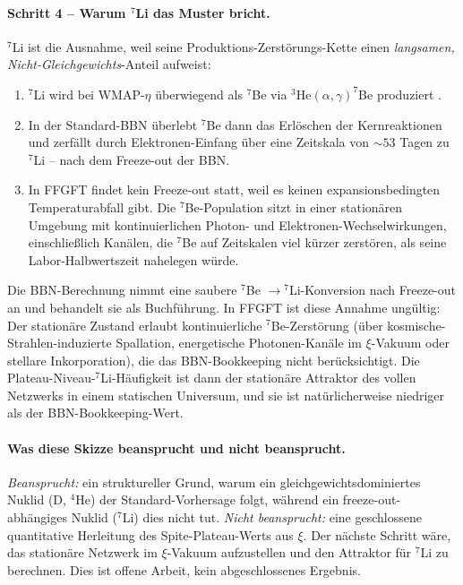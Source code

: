 \documentclass[11pt,a4paper]{article}
\begin{document}
\paragraph{Schritt 4 -- Warum $^7$Li das Muster bricht.}
$^7$Li ist die Ausnahme, weil seine Produktions-Zerstörungs-Kette einen \emph{langsamen, Nicht-Gleichgewichts}-Anteil aufweist:
\begin{enumerate}\itemsep1pt
\item $^7$Li wird bei WMAP-$\eta$ überwiegend als $^7$Be via $^3$He$(\alpha,\gamma)^7$Be produziert \cite{fields2011}.
\item In der Standard-BBN überlebt $^7$Be dann das Erlöschen der Kernreaktionen und zerfällt durch Elektronen-Einfang über eine Zeitskala von $\sim 53$ Tagen zu $^7$Li -- nach dem Freeze-out der BBN.
\item In FFGFT findet kein Freeze-out statt, weil es keinen expansionsbedingten Temperaturabfall gibt. Die $^7$Be-Population sitzt in einer stationären Umgebung mit kontinuierlichen Photon- und Elektronen-Wechselwirkungen, einschließlich Kanälen, die $^7$Be auf Zeitskalen viel kürzer zerstören, als seine Labor-Halbwertszeit nahelegen würde.
\end{enumerate}
Die BBN-Berechnung nimmt eine saubere $^7$Be $\to {}^7$Li-Konversion nach Freeze-out an und behandelt sie als Buchführung. In FFGFT ist diese Annahme ungültig: Der stationäre Zustand erlaubt kontinuierliche $^7$Be-Zerstörung (über kosmische-Strahlen-induzierte Spallation, energetische Photonen-Kanäle im $\xi$-Vakuum oder stellare Inkorporation), die das BBN-Bookkeeping nicht berücksichtigt. Die Plateau-Niveau-$^7$Li-Häufigkeit ist dann der stationäre Attraktor des vollen Netzwerks in einem statischen Universum, und sie ist natürlicherweise niedriger als der BBN-Bookkeeping-Wert.

\paragraph{Was diese Skizze beansprucht und nicht beansprucht.}
\textit{Beansprucht:} ein struktureller Grund, warum ein gleichgewichtsdominiertes Nuklid (D, $^4$He) der Standard-Vorhersage folgt, während ein freeze-out-abhängiges Nuklid ($^7$Li) dies nicht tut. \textit{Nicht beansprucht:} eine geschlossene quantitative Herleitung des Spite-Plateau-Werts aus $\xi$. Der nächste Schritt wäre, das stationäre Netzwerk im $\xi$-Vakuum aufzustellen und den Attraktor für $^7$Li zu berechnen. Dies ist offene Arbeit, kein abgeschlossenes Ergebnis.
\end{document}
